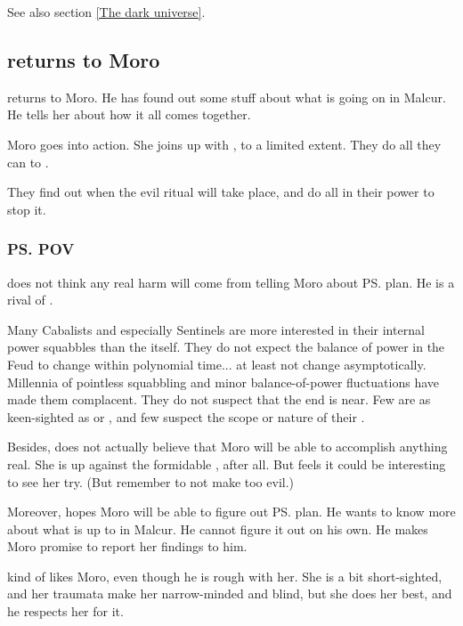 \begin{garbage}
See also section \ref{The dark universe}. 









\subsection{\Nasshikerr{} returns to Moro}
\hs{\Nasshikerr} returns to Moro. 
He has found out some stuff about what is going on in Malcur. 
He tells her about how it all comes together. 

Moro goes into action. 
She joins up with \Tiroco, to a limited extent. 
They do all they can to . 

They find out when the evil ritual will take place, and do all in their power to stop it. 





\subsubsection{\ps{\Nasshikerr} POV}
\Nasshikerr{} does not think any real harm will come from telling Moro about \ps{\Secherdamon} plan. 
He is a rival of \Secherdamon. 

Many Cabalists and especially Sentinels are more interested in their internal power squabbles than the  itself. 
They do not expect the balance of power in the Feud to change within polynomial time... at least not change asymptotically. 
Millennia of pointless squabbling and minor balance-of-power fluctuations have made them complacent. 
They do not suspect that the end is near. 
Few are as keen-sighted as \Secherdamon{} or \Azraid, and few suspect the scope or nature of their . 

Besides, \Nasshikerr{} does not actually believe that Moro will be able to accomplish anything real. 
She is up against the formidable , after all. 
But \Nasshikerr{} feels it could be interesting to see her try. 
(But remember to not make \Nasshikerr{} too evil.) 

Moreover, \Nasshikerr{} hopes Moro will be able to figure out \ps{\Secherdamon} plan. 
He wants to know more about what \Secherdamon{} is up to in Malcur. 
He cannot figure it out on his own. 
He makes Moro promise to report her findings to him. 

\Nasshikerr{} kind of likes Moro, even though he is rough with her. 
She is a bit short-sighted, and her traumata make her narrow-minded and blind, but she does her best, and he respects her for it. 






\end{garbage}
